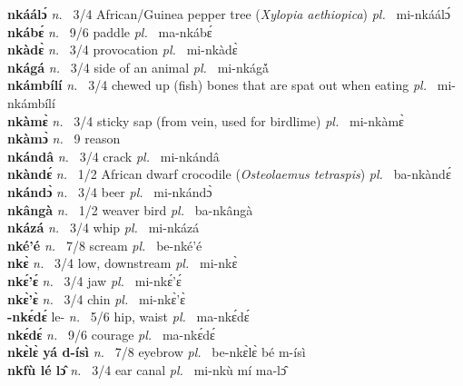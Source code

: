 {\bfseries nkáálɔ́}  {\itshape n.~} 3/4 African/Guinea pepper tree ({\itshape Xylopia aethiopica}) {\itshape pl.~} mi-nkáálɔ́    \\ 
{\bfseries nkábɛ́}  {\itshape n.~} 9/6 paddle {\itshape pl.~} ma-nkábɛ́    \\ 
{\bfseries nkàdɛ̀}  {\itshape n.~} 3/4 provocation {\itshape pl.~} mi-nkàdɛ̀    \\ 
{\bfseries nkágá}  {\itshape n.~} 3/4 side of an animal {\itshape pl.~} mi-nkágá̀        \\ 
{\bfseries nkámbílí}  {\itshape n.~} 3/4 chewed up (fish) bones that are spat out when eating {\itshape pl.~} mi-nkámbílí    \\ 
{\bfseries nkàmɛ̀}  {\itshape n.~} 3/4 sticky sap (from vein, used for birdlime) {\itshape pl.~} mi-nkàmɛ̀    \\ 
{\bfseries nkàmɔ̀}  {\itshape n.~} 9 reason    \\ 
{\bfseries nkándâ}  {\itshape n.~} 3/4 crack {\itshape pl.~} mi-nkándâ    \\ 
{\bfseries nkàndɛ́}  {\itshape n.~} 1/2 African dwarf crocodile ({\itshape Osteolaemus tetraspis}) {\itshape pl.~} ba-nkàndɛ́    \\ 
{\bfseries nkándɔ̀}  {\itshape n.~} 3/4 beer {\itshape pl.~} mi-nkándɔ̀    \\ 
{\bfseries nkângà}  {\itshape n.~} 1/2 weaver bird {\itshape pl.~} ba-nkângà    \\ 
{\bfseries nkázá}  {\itshape n.~} 3/4 whip {\itshape pl.~} mi-nkázá    \\ 
{\bfseries nké'é}  {\itshape n.~} 7/8 scream {\itshape pl.~} be-nké'é    \\ 
{\bfseries nkɛ̀}  {\itshape n.~} 3/4 low, downstream {\itshape pl.~} mi-nkɛ̀    \\ 
{\bfseries nkɛ́'ɛ́}  {\itshape n.~} 3/4 jaw {\itshape pl.~} mi-nkɛ́'ɛ́    \\ 
{\bfseries nkɛ̀'ɛ̀}  {\itshape n.~} 3/4 chin {\itshape pl.~} mi-nkɛ̀'ɛ̀    \\ 
{\bfseries -nkɛ́dɛ́} le- {\itshape n.~} 5/6 hip, waist {\itshape pl.~} ma-nkɛ́dɛ́    \\ 
{\bfseries nkɛ́dɛ́}  {\itshape n.~} 9/6 courage {\itshape pl.~} ma-nkɛ́dɛ́    \\ 
{\bfseries nkɛ̀lɛ̀ yá d-ísì}  {\itshape n.~} 7/8 eyebrow {\itshape pl.~} be-nkɛ̀lɛ̀ bé m-ísì    \\ 
{\bfseries nkfù lé lɔ̂}  {\itshape n.~} 3/4 ear canal {\itshape pl.~} mi-nkù mí ma-lɔ̂    \\ 
